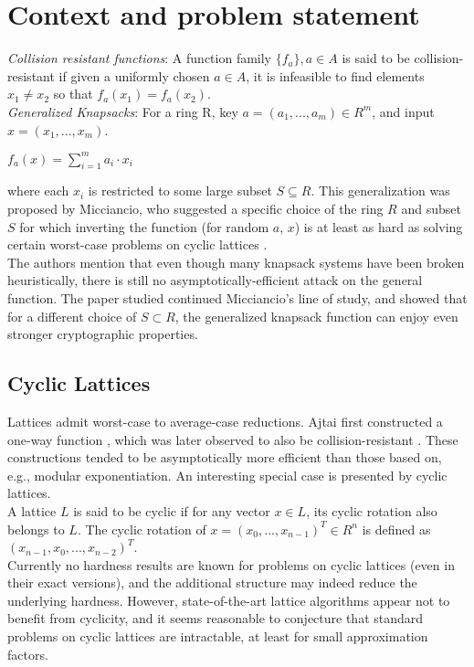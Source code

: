 \section{Context and problem statement}
\textit{Collision resistant functions}: A function family $\{f_a\}, a \in A$ is said to be collision-resistant if given a uniformly chosen $a \in A$, it is infeasible to find elements $x_1 \neq x_2$ so that $f_a(x_1) = f_a(x_2)$.
\\
\textit{Generalized Knapsacks}: For a ring R, key $a = (a_1 , . . . , a_m) \in R^m$, and input $x = (x_1 , . . . , x_m)$.
\begin{center}
$f_a(x) = \sum_{i=1}^{m}a_i·x_i$
\end{center}
where each $x_i$ is restricted to some large subset $S \subseteq R$. This generalization was proposed by Micciancio, who suggested a specific choice of the ring $R$ and subset $S$ for which inverting the function (for random $a$, $x$) is at least as hard as solving certain worst-case problems on cyclic lattices \cite{Micciancio:2002:GCK:645413.652130}.
\\
The authors mention that even though many knapsack systems have been broken heuristically, there is still no asymptotically-efficient attack on the general function. The paper studied continued Micciancio’s line of study, and showed that for a different choice of $S \subset R$, the generalized knapsack function can enjoy even stronger cryptographic properties.
\subsection{Cyclic Lattices}
Lattices admit worst-case to average-case reductions. Ajtai first constructed a one-way function \cite{Ajtai:1996:GHI:237814.237838}, which was later observed to also be collision-resistant \cite{Bellare:1997:NPC:1754542.1754560}. These constructions tended to be asymptotically more efficient than those based on, e.g., modular exponentiation. An interesting special case is presented by cyclic lattices. 
\\
A lattice $L$ is said to be cyclic if for any
vector $x \in L$, its cyclic rotation also belongs to $L$. The cyclic rotation of $x = (x_0 , . . . , x_{n−1})^T \in R^n$ is defined as $(x_{n-1}, x_0, . . . , x_{n-2})^T$.
\\
Currently no hardness results are known for problems on cyclic lattices (even in their exact versions), and the additional structure may indeed reduce the underlying hardness. However, state-of-the-art lattice algorithms appear not to benefit from cyclicity, and it seems reasonable to conjecture that standard problems on cyclic lattices are intractable, at least for small approximation factors.